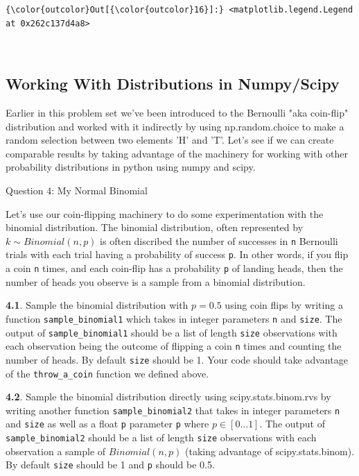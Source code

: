\documentclass[11pt]{article}
\begin{document}
\begin{Verbatim}[commandchars=\\\{\}]
{\color{outcolor}Out[{\color{outcolor}16}]:} <matplotlib.legend.Legend at 0x262c137d4a8>
\end{Verbatim}
            
    \begin{center}
    \end{center}
    { \hspace*{\fill} \\}
    
    \subsection{Working With Distributions in
Numpy/Scipy}\label{working-with-distributions-in-numpyscipy}

Earlier in this problem set we've been introduced to the Bernoulli "aka
coin-flip" distribution and worked with it indirectly by using
np.random.choice to make a random selection between two elements 'H' and
'T'. Let's see if we can create comparable results by taking advantage
of the machinery for working with other probability distributions in
python using numpy and scipy.

     Question 4: My Normal Binomial

Let's use our coin-flipping machinery to do some experimentation with
the binomial distribution. The binomial distribution, often represented
by \(k \sim Binomial(n, p)\) is often discribed the number of successes
in \texttt{n} Bernoulli trials with each trial having a probability of
success \texttt{p}. In other words, if you flip a coin \texttt{n} times,
and each coin-flip has a probability \texttt{p} of landing heads, then
the number of heads you observe is a sample from a binomial
distribution.

\textbf{4.1}. Sample the binomial distribution with \(p = 0.5\) using
coin flips by writing a function \texttt{sample\_binomial1} which takes
in integer parameters \texttt{n} and \texttt{size}. The output of
\texttt{sample\_binomial1} should be a list of length \texttt{size}
observations with each observation being the outcome of flipping a coin
\texttt{n} times and counting the number of heads. By default
\texttt{size} should be 1. Your code should take advantage of the
\texttt{throw\_a\_coin} function we defined above.

\textbf{4.2}. Sample the binomial distribution directly using
scipy.stats.binom.rvs by writing another function
\texttt{sample\_binomial2} that takes in integer parameters \texttt{n}
and \texttt{size} as well as a float \texttt{p} parameter \texttt{p}
where \(p \in [0 \ldots 1]\). The output of \texttt{sample\_binomial2}
should be a list of length \texttt{size} observations with each
observation a sample of \(Binomial(n, p)\) (taking advantage of
scipy.stats.binom). By default \texttt{size} should be 1 and \texttt{p}
should be 0.5.
\end{document}
